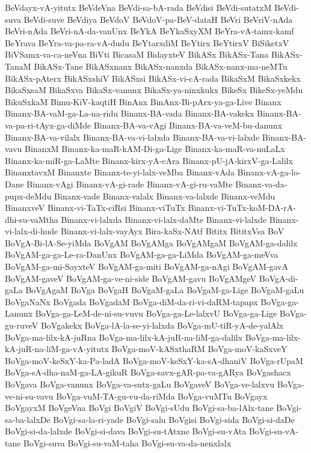 {BeVdayx-vA-yitutx
BeVdeVna
BeVdi-sa-bA-rada
BeVdisi
BeVdi-sutatxM
BeVdi-suva
BeVdi-suve
BeVdiya
BeVdoV
BeVdoV-pa-BeV-dataH
BeVri
BeVriV-nAda
BeVri-nAda
BeVri-nA-da-vanUnx
BeYkA
BeYkaSxyXM
BeYra-vA-tamx-kamf
BeYrava
BeYra-va-pa-ra-vA-dudu
BeYtarxdiM
BeYtirx
BeYtirxV
BiSiketxV
BiVSamx-va-ca-neVna
BiVti
BicasaM
BidayxteV
BikASx
BikASx-Tana
BikASx-TanaM
BikASx-Tane
BikASxnanx
BikASx-nanxda
BikASx-nanx-ma-neMTu
BikASx-pAterx
BikASxshiV
BikASxsi
BikASx-vi-cA-rada
BikaSxM
BikaSxkekx
BikaSxsaM
BikaSxva
BikaSx-vanunx
BikaSx-ya-ninxkukx
BikeSx
BikeSx-yeMdu
BikuSxkaM
Bimu-KiV-kaqtiH
BinAnx
BinAnx-Bi-pArx-ya-ga-Live
Binanx
Binanx-BA-vaM-ga-La-na-ridu
Binanx-BA-vada
Binanx-BA-vakekx
Binanx-BA-va-pa-ri-tAyx-ga-diMde
Binanx-BA-va-vAgi
Binanx-BA-va-veM-bu-danunx
Binanx-BA-va-vilalx
Binanx-BA-va-vi-lalxda
Binanx-BA-va-vi-lalxde
Binanx-BA-vavu
BinanxM
Binanx-ka-maR-kAM-Di-ga-Lige
Binanx-ka-maR-va-nuLaLx
Binanx-ka-miR-ga-LaMte
Binanx-kirx-yA-cAra
Binanx-pU-jA-kirxV-ga-Lalilx
BinanxtavxM
Binanxte
Binanx-te-yi-lalx-veMba
Binanx-vAda
Binanx-vA-ga-lo-Dane
Binanx-vAgi
Binanx-vA-gi-rade
Binanx-vA-gi-ru-vaMte
Binanx-va-da-pupx-deMdu
Binanx-vade
Binanx-valalx
Binanx-va-lalxde
Binanx-veMdu
BinanxveV
Binanx-vi-TaTx-ciRsi
Binanx-viTuTx
Binanx-vi-TuTx-koM-DA-rA-dhi-su-vaMtha
Binanx-vi-lalxda
Binanx-vi-lalx-daMte
Binanx-vi-lalxde
Binanx-vi-lalx-di-hude
Binanx-vi-lalx-vayAyx
Bira-kaSx-NAtf
Bititx
BititxVsa
BoV
BoVgA-Bi-lA-Se-yiMda
BoVgAM
BoVgAMga
BoVgAMgaM
BoVgAM-ga-dalilx
BoVgAM-ga-ga-Le-ra-DanUnx
BoVgAM-ga-ga-LiMda
BoVgAM-ga-meVva
BoVgAM-ga-mi-SayxteV
BoVgAM-ga-miti
BoVgAM-ga-nAgi
BoVgAM-gavA
BoVgAM-gaveV
BoVgAM-ga-ve-ni-side
BoVgAM-gavu
BoVgAMgeV
BoVgA-di-gaLa
BoVgAgaM
BoVga
BoVgaH
BoVgaM-gaLa
BoVgaM-ga-Lige
BoVgaM-gaLu
BoVgaNaNx
BoVgada
BoVgadaM
BoVga-diM-da-ri-vi-daRM-tapapx
BoVga-ga-Lanunx
BoVga-ga-LeM-de-ni-su-vuvu
BoVga-ga-Le-lalxvU
BoVga-ga-Lige
BoVga-gu-ruveV
BoVgakekx
BoVga-lA-la-se-yi-lalxda
BoVga-mU-tiR-yA-de-yalAlx
BoVga-ma-lilx-kA-juRna
BoVga-ma-lilx-kA-juR-na-liM-ga-dalilx
BoVga-ma-lilx-kA-juR-na-liM-ga-vA-yitutx
BoVga-moV-kASxthaRM
BoVga-moV-kaSxveY
BoVga-moV-keSxY-ka-Pa-ladA
BoVga-moV-keSxY-ka-sA-dhaniV
BoVga-rUpaM
BoVga-sA-dha-naM-ga-LA-gikuR
BoVga-savx-gAR-pa-va-gARya
BoVgashacx
BoVgava
BoVga-vanunx
BoVga-va-sutx-gaLu
BoVgaveV
BoVga-ve-lalxvu
BoVga-ve-ni-su-vavu
BoVga-vuM-TA-gu-vu-da-riMda
BoVga-vuMTu
BoVgayx
BoVgayxM
BoVgeVna
BoVgi
BoVgiV
BoVgi-sUdu
BoVgi-sa-ba-lAlx-tane
BoVgi-sa-ba-lalxDe
BoVgi-sa-la-ri-yade
BoVgi-salu
BoVgisi
BoVgi-sida
BoVgi-si-daDe
BoVgi-si-da-lalxde
BoVgi-si-dava
BoVgi-su-tAtxne
BoVgi-su-vAta
BoVgi-su-vA-tane
BoVgi-suva
BoVgi-su-vaM-taha
BoVgi-su-va-da-nenxlalx
}
